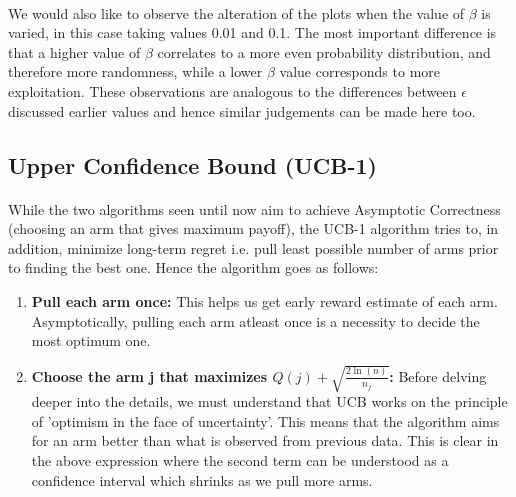 \documentclass[12pt]{extarticle}
\begin{document}
\paragraph{} We would also like to observe the alteration of the plots when the value of $\beta$ is varied, in this case taking values 0.01 and 0.1. The most important difference is that a higher value of $\beta$ correlates to a more even probability distribution, and therefore more randomness, while a lower $\beta$ value corresponds to more exploitation. These observations are analogous to the differences between $\epsilon$ discussed earlier values and hence similar judgements can be made here too.

\subsection{Upper Confidence Bound (UCB-1)}

\paragraph{} While the two algorithms seen until now aim to achieve Asymptotic Correctness (choosing an arm that gives maximum payoff), the UCB-1 algorithm tries to, in addition, minimize long-term regret i.e. pull least possible number of arms prior to finding the best one. Hence the algorithm goes as follows:

\begin{enumerate}
	\item \textbf{Pull each arm once:} This helps us get early reward estimate of each arm. Asymptotically, pulling each arm atleast once is a necessity to decide the most optimum one.
	\item \textbf{Choose the arm j that maximizes $Q(j) + \sqrt{\frac{2\ln(n)}{n_j}}$:} Before delving deeper into the details, we must understand that UCB works on the principle of 'optimism in the face of uncertainty'. This means that the algorithm aims for an arm better than what is observed from previous data. This is clear in the above expression where the second term can be understood as a confidence interval which shrinks as we pull more arms.
\end{enumerate}
\end{document}
